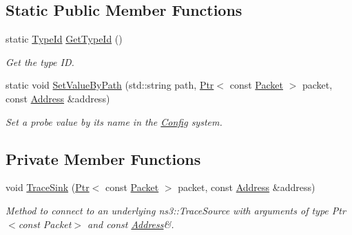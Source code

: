 \subsection*{Static Public Member Functions}
\begin{DoxyCompactItemize}
\item 
static \hyperlink{classns3_1_1TypeId}{Type\+Id} \hyperlink{classns3_1_1ApplicationPacketProbe_aeaab4ee7ff5a096c759241d18c052b43}{Get\+Type\+Id} ()
\begin{DoxyCompactList}\small\item\em Get the type ID. \end{DoxyCompactList}\item 
static void \hyperlink{classns3_1_1ApplicationPacketProbe_afa21a0ed48f95c05505dda61fa208b66}{Set\+Value\+By\+Path} (std\+::string path, \hyperlink{classns3_1_1Ptr}{Ptr}$<$ const \hyperlink{classns3_1_1Packet}{Packet} $>$ packet, const \hyperlink{classns3_1_1Address}{Address} \&address)
\begin{DoxyCompactList}\small\item\em Set a probe value by its name in the \hyperlink{namespacens3_1_1Config}{Config} system. \end{DoxyCompactList}\end{DoxyCompactItemize}
\subsection*{Private Member Functions}
\begin{DoxyCompactItemize}
\item 
void \hyperlink{classns3_1_1ApplicationPacketProbe_ab327ce029e0ee6343952c8ba01d82c3d}{Trace\+Sink} (\hyperlink{classns3_1_1Ptr}{Ptr}$<$ const \hyperlink{classns3_1_1Packet}{Packet} $>$ packet, const \hyperlink{classns3_1_1Address}{Address} \&address)
\begin{DoxyCompactList}\small\item\em Method to connect to an underlying ns3\+::\+Trace\+Source with arguments of type Ptr$<$const Packet$>$ and const \hyperlink{classns3_1_1Address}{Address}\&. \end{DoxyCompactList}\end{DoxyCompactItemize}
